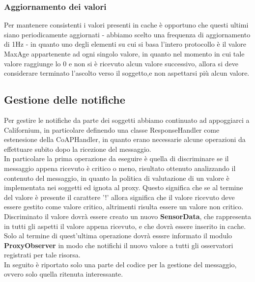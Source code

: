 \subsubsection{Aggiornamento dei valori}
Per mantenere consistenti i valori presenti in cache è opportuno che questi ultimi siano periodicamente aggiornati - abbiamo scelto una frequenza di aggiornamento di 1Hz - in quanto uno degli elementi su cui si basa l'intero protocollo è il valore MaxAge appartenente ad ogni singolo valore, in quanto nel momento in cui tale valore raggiunge lo 0 e non si è ricevuto alcun valore successivo, allora si deve considerare terminato l'ascolto verso il soggetto,e non aspettarsi più alcun valore. \\

\subsection{Gestione delle notifiche}
Per gestire le notifiche da parte dei soggetti abbiamo continuato ad appoggiarci a Californium, in particolare definendo una classe ResponseHandler come estenesione della CoAPHandler, in quanto erano necessarie alcune operazioni da effettuare subito dopo la ricezione del messaggio. \\
In particolare la prima operazione da eseguire è quella di discriminare se il messaggio appena ricevuto è critico o meno, risultato ottenuto analizzando il contenuto del messaggio, in quanto la politica di valutazione di un valore è implementata nei soggetti ed ignota al proxy. Questo significa che se al termine del valore è presente il carattere '!' allora significa che il valore ricevuto deve essere gestito come valore critico, altrimenti risulta essere un valore non critico. \\
Discriminato il valore dovrà essere creato un nuovo \textbf{SensorData}, che rappresenta in tutti gli aspetti il valore appena ricevuto, e che dovrà essere inserito in cache. Solo al termine di quest'ultima operazione dovrà esssre informato il modulo \textbf{ProxyObserver} in modo che notifichi il nuovo valore a tutti gli osservatori registrati per tale risorsa. \\
In seguito è riportato solo una parte del codice per la gestione del messaggio, ovvero solo quella ritenuta interessante. \\

